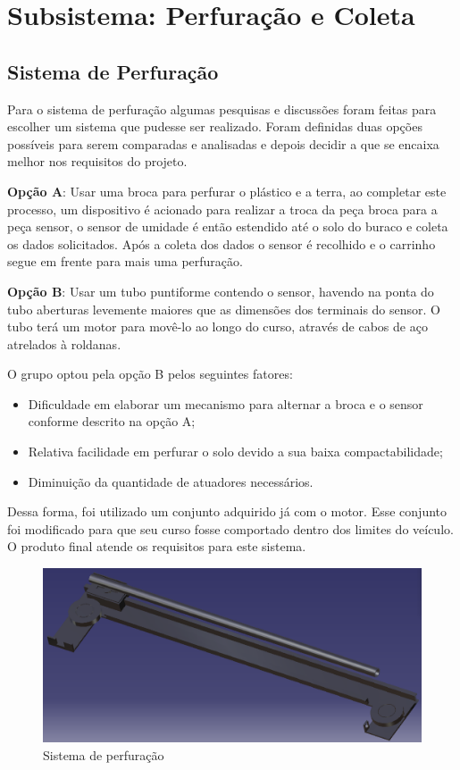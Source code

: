 \section{Subsistema: Perfuração e Coleta}

  \subsection{Sistema de Perfuração}
  
  Para o sistema de perfuração algumas pesquisas e discussões foram feitas para escolher um sistema que pudesse ser realizado. Foram definidas duas opções possíveis para serem comparadas e analisadas e depois decidir a que se encaixa melhor nos requisitos do projeto.

  \textbf{Opção A}: Usar uma broca para perfurar o plástico e a terra, ao completar este
  processo, um dispositivo é acionado para realizar a troca da peça broca para
  a peça sensor, o sensor de umidade é então estendido até o solo do buraco e
  coleta os dados solicitados. Após a coleta dos dados o sensor é recolhido e o
  carrinho segue em frente para mais uma perfuração.

  \textbf{Opção B}: Usar um tubo puntiforme contendo o sensor, havendo na ponta do
  tubo aberturas levemente maiores que as dimensões dos terminais do sensor. O tubo terá
  um motor para movê-lo ao longo do curso, através de cabos de aço atrelados à roldanas. 

  O grupo optou pela opção B pelos seguintes fatores:

 \begin{itemize}
 	\item Dificuldade em elaborar um mecanismo para alternar a broca e o sensor conforme descrito na opção A;
 	\item Relativa facilidade em perfurar o solo devido a sua baixa compactabilidade;
 	\item Diminuição da quantidade de atuadores necessários.
 \end{itemize}

	Dessa forma, foi utilizado um conjunto adquirido já com o motor. Esse conjunto foi modificado para que seu curso fosse comportado dentro dos limites do veículo. O produto final atende os requisitos para este sistema.
	
		\begin{figure}[!htbp]
			\begin{center}
				\includegraphics[width=.4\textwidth]{figuras/perfuracao.eps}
				\caption{Sistema de perfuração}
			\end{center}
		\end{figure}
	
